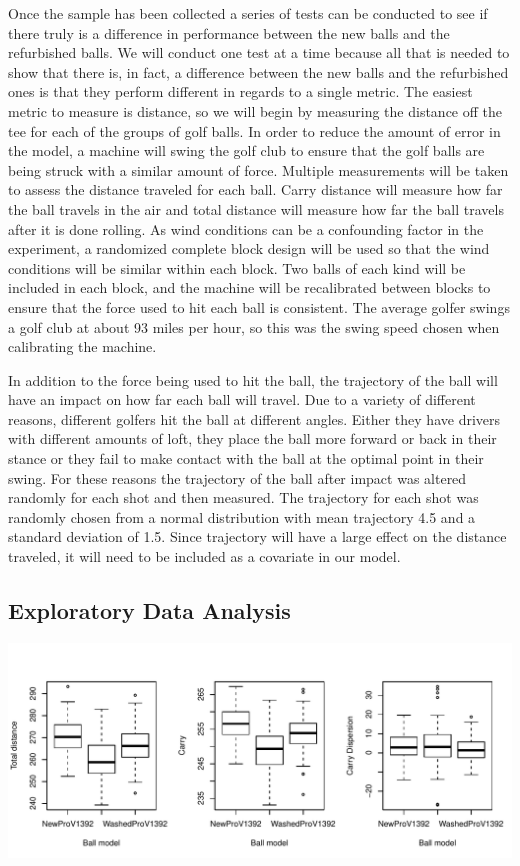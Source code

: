 \documentclass{article}\usepackage[]{graphicx}\usepackage[]{color}
\makeatletter
\def\maxwidth{ %
  \ifdim\Gin@nat@width>\linewidth
    \linewidth
  \else
    \Gin@nat@width
  \fi
}
\makeatother
\begin{document}
Once the sample has been collected a series of tests can be conducted to see if there truly is a difference in performance between the new balls and the refurbished balls. We will conduct one test at a time because all that is needed to show that there is, in fact, a difference between the new balls and the refurbished ones is that they perform different in regards to a single metric. The easiest metric to measure is distance, so we will begin by measuring the distance off the tee for each of the groups of golf balls. In order to reduce the amount of error in the model, a machine will swing the golf club to ensure that the golf balls are being struck with a similar amount of force. Multiple measurements will be taken to assess the distance traveled for each ball. Carry distance will measure how far the ball travels in the air and total distance will measure how far the ball travels after it is done rolling. As wind conditions can be a confounding factor in the experiment, a randomized complete block design will be used so that the wind conditions will be similar within each block. Two balls of each kind will be included in each block, and the machine will be recalibrated between blocks to ensure that the force used to hit each ball is consistent. The average golfer swings a golf club at about 93 miles per hour, so this was the swing speed chosen when calibrating the machine.

In addition to the force being used to hit the ball, the trajectory of the ball will have an impact on how far each ball will travel. Due to a variety of different reasons, different golfers hit the ball at different angles. Either they have drivers with different amounts of loft, they place the ball more forward or back in their stance or they fail to make contact with the ball at the optimal point in their swing. For these reasons the trajectory of the ball after impact was altered randomly for each shot and then measured. The trajectory for each shot was randomly chosen from a normal distribution with mean trajectory 4.5 and a standard deviation of 1.5. Since trajectory will have a large effect on the distance traveled, it will need to be included as a covariate in our model. 

\subsection*{Exploratory Data Analysis}


\includegraphics[width=\maxwidth]{figure/box_plots-1} 
\end{document}
